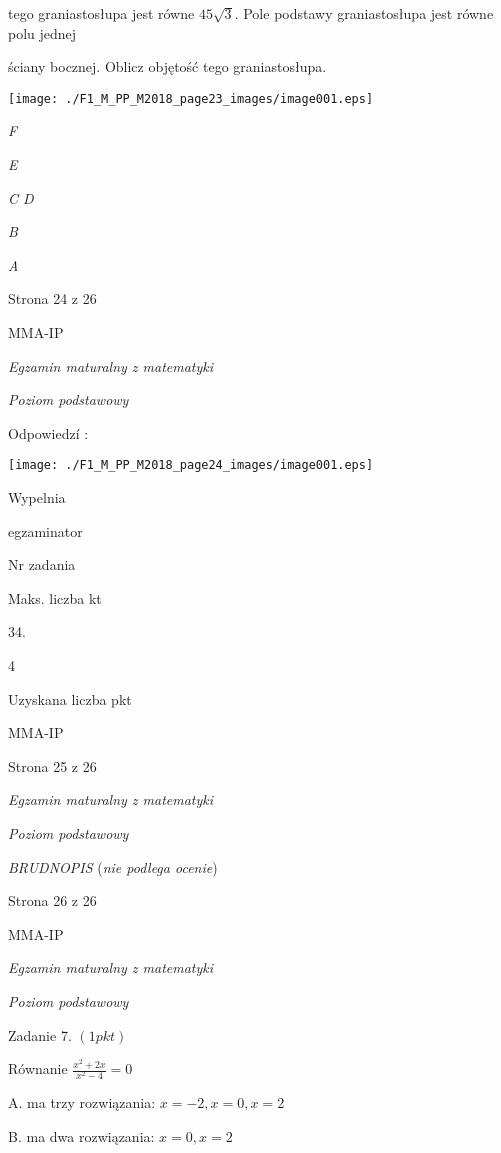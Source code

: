 \documentclass[a4paper,12pt]{article}
\begin{document}
tego graniastosłupa jest równe $45\sqrt{3}$. Pole podstawy graniastosłupa jest równe polu jednej

ściany bocznej. Oblicz objętość tego graniastosłupa.
\begin{center}
\texttt{[image: ./F1\_M\_PP\_M2018\_page23\_images/image001.eps]}
\end{center}
{\it F}

{\it E}

{\it C  D}

{\it B}

{\it A}

Strona 24 z 26

MMA-IP





{\it Egzamin maturalny z matematyki}

{\it Poziom podstawowy}

Odpowiedzí :
\begin{center}
\texttt{[image: ./F1\_M\_PP\_M2018\_page24\_images/image001.eps]}
\end{center}
Wypelnia

egzaminator

Nr zadania

Maks. liczba kt

34.

4

Uzyskana liczba pkt

MMA-IP

Strona 25 z 26





{\it Egzamin maturalny z matematyki}

{\it Poziom podstawowy}

{\it BRUDNOPIS} ({\it nie podlega ocenie})

Strona 26 z 26

MMA-IP





{\it Egzamin maturalny z matematyki}

{\it Poziom podstawowy}

Zadanie 7. $(1pkt)$

Równanie $\displaystyle \frac{x^{2}+2x}{x^{2}-4}=0$

A. ma trzy rozwiązania: $x=-2, x=0, x=2$

B. ma dwa rozwiązania: $x=0, x=2$
\end{document}
